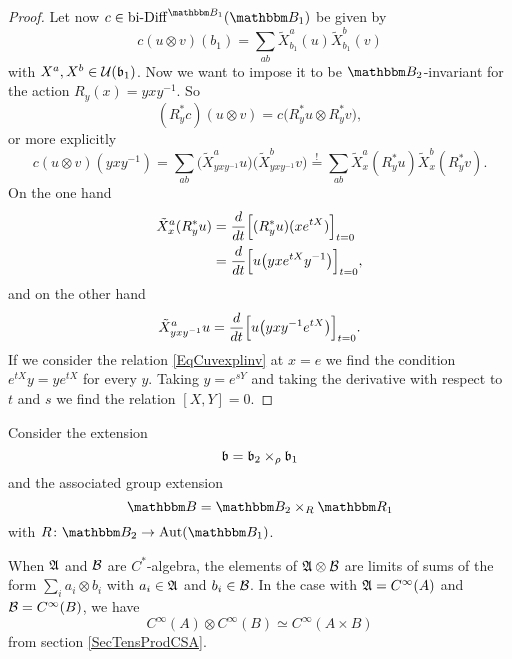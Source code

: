 \begin{proof}
	Let now $c\in\biDiff^{\eB_1}(\eB_1)$ be given by
	\begin{equation}
		c(u\otimes v)(b_1)=\sum_{ab}\tilde X_{b_1}^a(u)\tilde X_{b_1}^b(v)
	\end{equation}
	with $X^a,X^b\in\mathcal{U}(\mathfrak{b}_1)$. Now we want to impose it to be $\eB_2$-invariant for the action $R_y(x)=yxy^{-1}$. So
	\begin{equation}
		(R_y^*c)(u\otimes v)=c\big( R^*_yu\otimes R^*_yv \big),
	\end{equation}
	or more explicitly
	\begin{equation}		\label{EqCuvexplinv}
		c(u\otimes v)(yxy^{-1})=\sum_{ab}\big( \tilde X^a_{yxy^{-1}}u \big)\big( \tilde X^b_{yxy^{-1}}v \big)
		\stackrel{!}{=}\sum_{ab}\tilde X^a_x(R^*_yu)\tilde X^b_x(R^*_yv).
	\end{equation}
	On the one hand
	\begin{equation}
		\begin{aligned}[]
			\tilde X_x^a(R^*_yu)&=\Dsdd{ (R^*_yu)(x e^{tX}) }{t}{0}\\
			&=\Dsdd{ u\big( yx e^{tX}y^{-1} \big) }{t}{0},
		\end{aligned}
	\end{equation}
	and on the other hand
	\begin{equation}
		\tilde X^a_{yxy^{-1}}u=\frac{d}{dt}\Big[ u\big( yxy^{-1} e^{tX} \big) \Big]_{t=0}.
	\end{equation}
	If we consider the relation \eqref{EqCuvexplinv} at $x=e$ we find the condition $ e^{tX}y=y e^{tX}$ for every $y$. Taking $y= e^{sY}$ and taking the derivative with respect to $t$ and $s$ we find the relation $[X,Y]=0$.
\end{proof}

Consider the extension
\begin{equation}
	\mathfrak{b}=\mathfrak{b}_2\times_{\rho}\mathfrak{b}_1
\end{equation}
and the associated group extension
\begin{equation}
	\eB=\eB_2\times_R\eR_1
\end{equation}
with $R\colon \eB_2\to \Aut(\eB_1)$. 

When $\mathfrak{A}$ and $\mathcal{B}$ are $C^*$-algebra, the elements of $\mathfrak{A}\otimes \mathcal{B}$ are limits of sums of the form $\sum_ia_i\otimes b_i$ with $a_i\in\mathfrak{A}$ and $b_i\in\mathcal{B}$. In the case with $\mathfrak{A}= C^{\infty}(A)$ and $\mathcal{B}= C^{\infty}(B)$, we have
\begin{equation}		\label{EqCABsimeqCACB}
	C^{\infty}(A)\otimes C^{\infty}(B)\simeq C^{\infty}(A\times B)
\end{equation}
from section \ref{SecTensProdCSA}.

